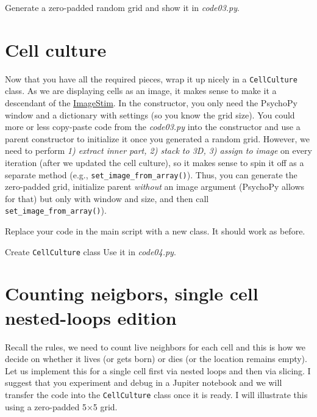 \documentclass[
]{book}
\begin{document}
Generate a zero-padded random grid and show it in \emph{code03.py}.

\hypertarget{cell-culture}{%
\section{Cell culture}\label{cell-culture}}

Now that you have all the required pieces, wrap it up nicely in a \texttt{CellCulture} class. As we are displaying cells as an image, it makes sense to make it a descendant of the \href{https://psychopy.org/api/visual/imagestim.html}{ImageStim}. In the constructor, you only need the PsychoPy window and a dictionary with settings (so you know the grid size). You could more or less copy-paste code from the \emph{code03.py} into the constructor and use a parent constructor to initialize it once you generated a random grid. However, we need to perform \emph{1) extract inner part, 2) stack to 3D, 3) assign to image} on every iteration (after we updated the cell culture), so it makes sense to spin it off as a separate method (e.g., \texttt{set\_image\_from\_array()}). Thus, you can generate the zero-padded grid, initialize parent \emph{without} an image argument (PsychoPy allows for that) but only with window and size, and then call \texttt{set\_image\_from\_array()}).

Replace your code in the main script with a new class. It should work as before.

Create \texttt{CellCulture} class
Use it in \emph{code04.py}.

\hypertarget{counting-neigbors-single-cell-nested-loops-edition}{%
\section{Counting neigbors, single cell nested-loops edition}\label{counting-neigbors-single-cell-nested-loops-edition}}

Recall the rules, we need to count live neighbors for each cell and this is how we decide on whether it lives (or gets born) or dies (or the location remains empty). Let us implement this for a single cell first via nested loops and then via slicing. I suggest that you experiment and debug in a Jupiter notebook and we will transfer the code into the \texttt{CellCulture} class once it is ready. I will illustrate this using a zero-padded 5×5 grid.
\end{document}
